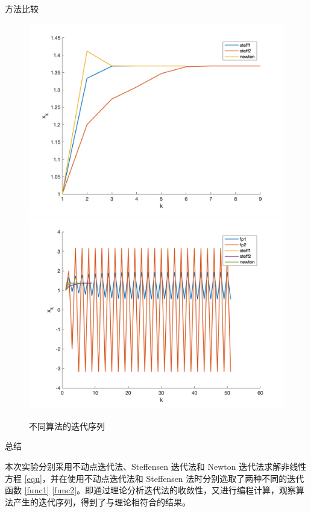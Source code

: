\documentclass[a4paper]{article}
\begin{document}
\begin{multicols}{2}
\begin{section}{方法比较}
	\begin{figure}[ht] %
		\centering %
		\includegraphics[width = \textwidth]{img/plot3.png} 
		\includegraphics[width = \textwidth]{img/plot5.png} 
		\caption{不同算法的迭代序列}
		\label{plot} 
	\end{figure}
	
\end{section}

\begin{section}{总结}
	
	本次实验分别采用不动点迭代法、Steffensen 迭代法和 Newton 迭代法求解非线性方程 \ref{equ}，并在使用不动点迭代法和 Steffensen 法时分别选取了两种不同的迭代函数 \ref{func1} \ref{func2}。即通过理论分析迭代法的收敛性，又进行编程计算，观察算法产生的迭代序列，得到了与理论相符合的结果。
	
\end{section}

\end{multicols}



%
%

\end{document}
